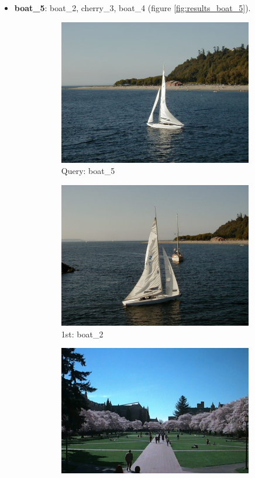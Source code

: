 \begin{itemize}
\item \textbf{boat\_5}: boat\_2, cherry\_3, boat\_4 (figure \ref{fig:results_boat_5}).
\begin{figure}[H]
	\centering
	\begin{subfigure}{0.25\textwidth}
	  \centering
	  \includegraphics[width=0.9\linewidth]{../input/boat_5.jpg}
	  \caption{Query: boat\_5}
	\end{subfigure}%
	\begin{subfigure}{0.25\textwidth}
	  \centering
	  \includegraphics[width=0.9\linewidth]{../input/boat_2.jpg}
	  \caption{1st: boat\_2}
	\end{subfigure}%
	\begin{subfigure}{0.25\textwidth}
        \centering
        \includegraphics[width=0.9\linewidth]{../input/cherry_3.jpg}

\end{subfigure}
\end{figure}
\end{itemize}
